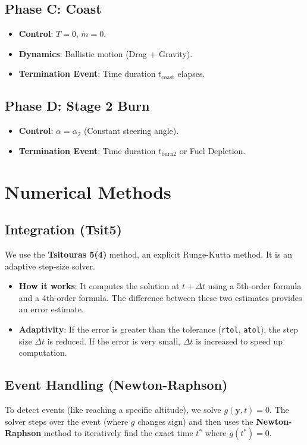 \documentclass[11pt]{article}
\begin{document}
\subsection{Phase C: Coast}
\begin{itemize}
    \item \textbf{Control}: $T = 0$, $\dot{m} = 0$.
    \item \textbf{Dynamics}: Ballistic motion (Drag + Gravity).
    \item \textbf{Termination Event}: Time duration $t_{\text{coast}}$ elapses.
\end{itemize}

\subsection{Phase D: Stage 2 Burn}
\begin{itemize}
    \item \textbf{Control}: $\alpha = \alpha_2$ (Constant steering angle).
    \item \textbf{Termination Event}: Time duration $t_{\text{burn2}}$ or Fuel Depletion.
\end{itemize}

\section{Numerical Methods}
\label{sec:numerical_methods}

\subsection{Integration (Tsit5)}
We use the \textbf{Tsitouras 5(4)} method, an explicit Runge-Kutta method. It is an adaptive step-size solver.
\begin{itemize}
    \item \textbf{How it works}: It computes the solution at $t + \Delta t$ using a 5th-order formula and a 4th-order formula. The difference between these two estimates provides an error estimate.
    \item \textbf{Adaptivity}: If the error is greater than the tolerance (\texttt{rtol}, \texttt{atol}), the step size $\Delta t$ is reduced. If the error is very small, $\Delta t$ is increased to speed up computation.
\end{itemize}

\subsection{Event Handling (Newton-Raphson)}
To detect events (like reaching a specific altitude), we solve $g(\bm{y}, t) = 0$.
The solver steps over the event (where $g$ changes sign) and then uses the \textbf{Newton-Raphson} method to iteratively find the exact time $t^*$ where $g(t^*) = 0$.
\end{document}
